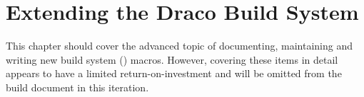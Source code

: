 
\chapter{Extending the Draco Build System}
\label{chap:extend}

This chapter should cover the advanced topic of documenting, maintaining and writing new build system (\cmake) macros. However, covering these items in detail appears to have a limited return-on-investment and will be omitted from the build document in this iteration.

